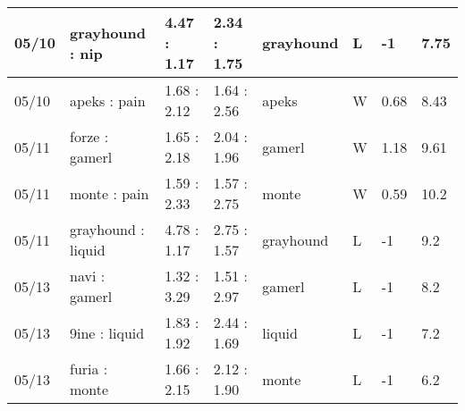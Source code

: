 \begin{small}
\begin{longtable}{|l|l|l|l|l|l|l|l|}
	05/10                               & grayhound : nip                     & 4.47 : 1.17                             & 2.34 : 1.75                             & grayhound                         & L                                 & -1                                   & 7.75                              \\ \hline
	05/10                               & apeks : pain                        & 1.68 : 2.12                             & 1.64 : 2.56                             & apeks                             & W                                 & 0.68                                 & 8.43                              \\ \hline
	05/11                               & forze : gamerl                      & 1.65 : 2.18                             & 2.04 : 1.96                             & gamerl                            & W                                 & 1.18                                 & 9.61                              \\ \hline
	05/11                               & monte : pain                        & 1.59 : 2.33                             & 1.57 : 2.75                             & monte                             & W                                 & 0.59                                 & 10.2                              \\ \hline
	05/11                               & grayhound : liquid                  & 4.78 : 1.17                             & 2.75 : 1.57                             & grayhound                         & L                                 & -1                                   & 9.2                               \\ \hline
	05/13                               & navi : gamerl                       & 1.32 : 3.29                             & 1.51 : 2.97                             & gamerl                            & L                                 & -1                                   & 8.2                               \\ \hline
	05/13                               & 9ine : liquid                       & 1.83 : 1.92                             & 2.44 : 1.69                             & liquid                            & L                                 & -1                                   & 7.2                               \\ \hline
	05/13                               & furia : monte                       & 1.66 : 2.15                             & 2.12 : 1.90                             & monte                             & L                                 & -1                                   & 6.2                               \\ \hline

\end{longtable}
\end{small}
